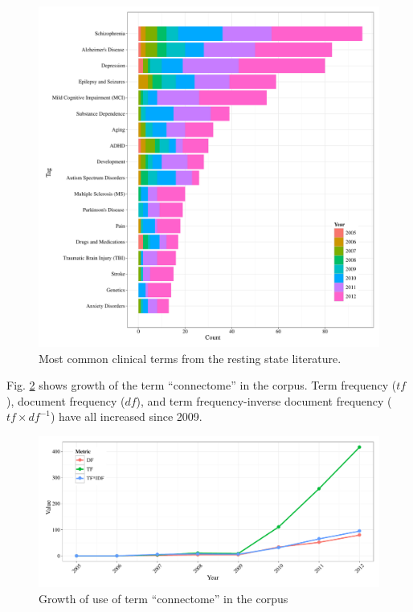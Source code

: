 \documentclass[5p]{elsarticle}
\begin{document}
\begin{figure}
  \begin{center}
    \includegraphics[width=\linewidth]{figures/clinical_bytag_hist}%
    \caption{Most common clinical terms from the resting state literature.
        \label{fig:clinical_bytag_hist}
    }
  \end{center}
\end{figure}

Fig. \ref{fig:connectome_growth} shows growth of the term ``connectome'' in the
corpus. Term frequency ($t\!f$), document frequency ($d\!f$), and term
frequency-inverse document frequency ($t\!f \times d\!f^{-1}$) have all
increased since 2009.  

\begin{figure}
  \begin{center}
    \includegraphics[width=\linewidth]{figures/connectome_growth}%
    \caption{Growth of use of term ``connectome'' in the corpus
        \label{fig:connectome_growth}
    }
  \end{center}
\end{figure}
\end{document}
